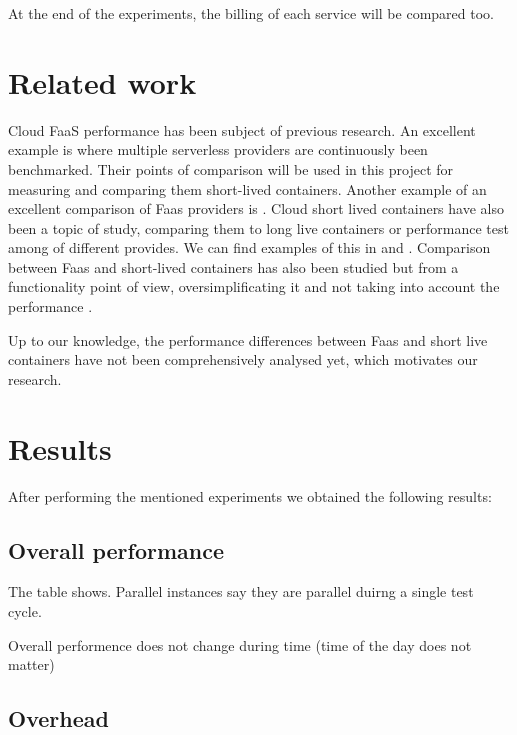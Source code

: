 \documentclass[11pt]{article}
\begin{document}
At the end of the experiments, the billing of each service will be compared too.






\section{Related work}
Cloud FaaS performance has been subject of previous research. An excellent example is \cite{aa} where multiple serverless providers are continuously been benchmarked. Their points of comparison will be used in this project for measuring and comparing them short-lived containers. Another example of an excellent comparison of Faas providers is \cite{bb}. Cloud short lived containers have also been a topic of study, comparing them to long live containers or performance test among of different provides. We can find examples of this in \cite{cc} and \cite{dd}. Comparison between Faas and short-lived containers has also been studied but from a functionality point of view, oversimplificating it and not taking into account the performance \cite{ee}\cite{ff}\cite{gg}.

Up to our knowledge, the performance differences between Faas and short live containers have not been comprehensively analysed yet, which motivates our research.

\section{Results}
After performing the mentioned experiments we obtained the following results:

\subsection{Overall performance}

The table shows. Parallel instances say they are parallel duirng a single test cycle. 

Overall performence does not change during time (time of the day does not matter)

\subsection{Overhead}
\end{document}
